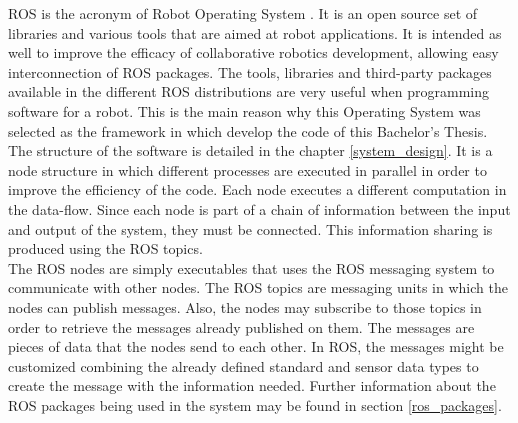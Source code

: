	ROS is the acronym of Robot Operating System \cite{ros}. It is an open source set of libraries and various tools that are aimed at robot applications. It is intended as well to improve the efficacy of collaborative robotics development, allowing easy interconnection of ROS packages. 
	The tools, libraries and third-party packages available in the different ROS distributions are very useful when programming software for a robot. This is the main reason why this Operating System was selected as the framework in which develop the code of this Bachelor's Thesis. 
	\\

	The structure of the software is detailed in the chapter \ref{system_design}.  It is a node structure in which different processes are executed in parallel in order to improve the efficiency of the code. Each node executes a different computation in the data-flow. 
	Since each node is part of a chain of information between the input and output of the system, they must be connected. This information sharing is produced using the ROS topics. 
	\\

	The ROS nodes are simply executables that uses the ROS messaging system to communicate with other nodes. The ROS topics are messaging units in which the nodes can publish messages. Also, the nodes may subscribe to those topics in order to retrieve the messages already published on them. 
	The messages are pieces of data that the nodes send to each other. In ROS, the messages might be customized combining the already defined standard and sensor data types to create the message with the information needed. 
	Further information about the ROS packages being used in the system may be found in section \ref{ros_packages}.



